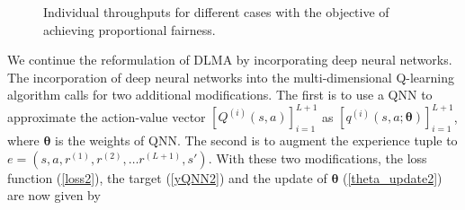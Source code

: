 \documentclass[journal,comsoc]{IEEEtran}
\begin{document}
\begin{figure*}[htbp]
	\centering
	\begin{minipage}[t]{0.98\linewidth}
		\centering
		\caption{Individual throughputs for different cases with the objective of achieving proportional fairness.}
		\label{fig:six2}
	\end{minipage}
\end{figure*}
We continue the reformulation of DLMA by incorporating deep neural networks. The incorporation of deep neural networks into the multi-dimensional Q-learning algorithm calls for two additional modifications. The first is to use a QNN to approximate the action-value vector $\left[ {{Q^{\left( i \right)}}\left( {s,a} \right)} \right]_{i = 1}^{L + 1}$  as  $ \left[ {{q^{\left( i \right)}}\left( {s,a;{\bm{\theta }}} \right)} \right]_{i = 1}^{L + 1} $, where $ \bm{\theta } $  is the weights of QNN. 
The second is to augment the experience tuple to  $ e = \left( {s,a,{r^{\left( 1 \right)}},{r^{\left( 2 \right)}}, \ldots {r^{\left( {L + 1} \right)}},s'} \right) $. With these two modifications, the loss function (\ref{loss2}), the target (\ref{yQNN2}) and the update of $ \bm{\theta} $ (\ref{theta_update2}) are now given by
\end{document}
